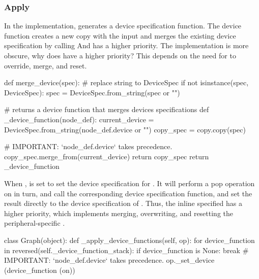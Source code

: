 \begin{content}
\subsubsection{Apply}
In the  implementation,  generates a device specification function. The device function creates a new copy with the input  and merges the existing  device specification by calling  And  has a higher priority. The implementation is more obscure, why does  have a higher priority? This depends on the need for  to override, merge, and reset.

\begin{leftbar}
\begin{python}
def merge_device(spec):
  # replace string to DeviceSpec
  if not isinstance(spec, DeviceSpec):
    spec = DeviceSpec.from_string(spec or "")

  # returns a device function that merges devices specifications
  def _device_function(node_def):
    current_device = DeviceSpec.from_string(node_def.device or "")
    copy_spec = copy.copy(spec)

    # IMPORTANT: `node\_def.device` takes precedence.
    copy_spec.merge_from(current_device)      
    return copy_spec
  return _device_function
\end{python}
\end{leftbar}

When ,  is set to set the device specification for . It will perform a pop operation on  in turn, and call the corresponding device specification function, and set the result directly to the device specification of . Thus, the inline specified  has a higher priority, which implements merging, overwriting, and resetting the peripheral-specific .

\begin{leftbar}
\begin{python}
class Graph(object):
  def _apply_device_functions(self, op):
    for device_function in reversed(self._device_function_stack):
      if device_function is None:
        break
      # IMPORTANT: `node\_def.device` takes precedence.  
      op._set_device (device_function (on)) 
\end{python}
\end{leftbar}

\end{content}
